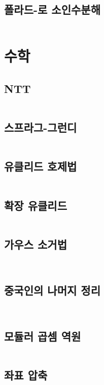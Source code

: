 \documentclass{article}
\begin{document}
\begin{multicols}{2}
\subsection{폴라드-로 소인수분해}
\inputminted[linenos, breaklines]{python}{codes/pollard-rho.py}

\section{수학}
\subsection{NTT}
\inputminted[linenos, breaklines]{python}{codes/ntt.py}
\subsection{스프라그-그런디}
\inputminted[linenos, breaklines]{python}{codes/nim.py}
\subsection{유클리드 호제법}
\inputminted[linenos, breaklines]{cpp}{codes/euclid.cpp}
\subsection{확장 유클리드}
\inputminted[linenos, breaklines]{python}{codes/eea.py}

\subsection{가우스 소거법}
\inputminted[linenos, breaklines]{cpp}{codes/SLAE.cpp}
\inputminted[linenos, breaklines]{cpp}{codes/SLAE_bit.cpp}

\subsection{중국인의 나머지 정리}
\inputminted[linenos, breaklines]{cpp}{codes/crt.cpp}
\inputminted[linenos, breaklines]{cpp}{codes/CRT_Diophantine.cpp}
\subsection{모듈러 곱셈 역원}
\inputminted[linenos, breaklines]{python}{codes/modular.py}
\subsection{좌표 압축}
\inputminted[linenos, breaklines]{python}{codes/comp.py}


\end{multicols}
\end{document}
